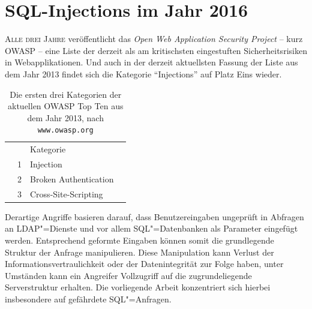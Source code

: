





\tableofcontents

















\chapter{SQL-Injections im Jahr 2016}

\lettrine[lines=2]{A}{lle drei Jahre }veröffentlicht das \emph{Open Web Application Security Project} -- kurz OWASP -- eine Liste der derzeit als am kritischsten eingestuften Sicherheitsrisiken in Webapplikationen. Und auch in der derzeit aktuellsten Fassung der Liste aus dem Jahr 2013 findet sich die Kategorie \enquote{Injections} auf Platz Eins wieder.

\begin{table}[ht!]
\begin{margincap}
\caption{Die ersten drei Kategorien der aktuellen OWASP Top Ten aus dem Jahr 2013, nach \texttt{www.owasp.org}}
\label{tab:owasp_top_ten}
\centering
\begin{tabu} to 
	\rowfont{\sffamily\bfseries\leavevmode\color{tableHeaderText}}
	& & Kategorie & \\
	\rowfont{\sffamily}
	& 1 & Injection & \\
	\rowfont{\sffamily}
	& 2 & Broken Authentication & \\
	\rowfont{\sffamily}
	& 3 & Cross-Site-Scripting & \\
\end{tabu}
\end{margincap}
\end{table}

Derartige Angriffe basieren darauf, dass Benutzereingaben ungeprüft in Abfragen an LDAP"=Dienste und vor allem SQL"=Datenbanken als Parameter eingefügt werden. Entsprechend geformte Eingaben können somit die grundlegende Struktur der Anfrage manipulieren. Diese Manipulation kann Verlust der Informationsvertraulichkeit oder der Datenintegrität zur Folge haben, unter Umständen kann ein Angreifer Vollzugriff auf die zugrundeliegende Serverstruktur erhalten. Die vorliegende Arbeit konzentriert sich hierbei insbesondere auf gefährdete SQL"=Anfragen.


